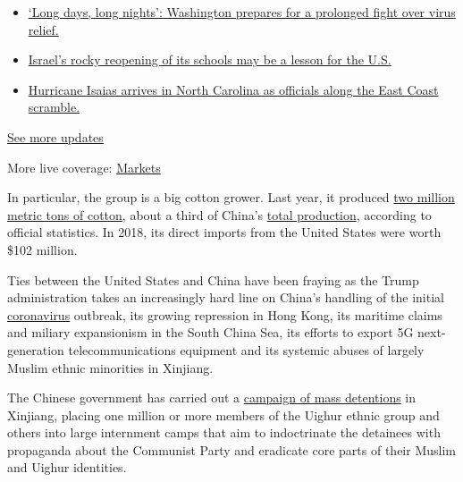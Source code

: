 \begin{itemize}
\tightlist
\item
  \href{https://www.nytimes.com/2020/08/04/world/coronavirus-covid-19.html?action=click\&pgtype=Article\&state=default\&region=MAIN_CONTENT_1\&context=storylines_live_updates\#link-6b644638}{`Long
  days, long nights': Washington prepares for a prolonged fight over
  virus relief.}
\item
  \href{https://www.nytimes.com/2020/08/04/world/coronavirus-covid-19.html?action=click\&pgtype=Article\&state=default\&region=MAIN_CONTENT_1\&context=storylines_live_updates\#link-7af9fca0}{Israel's
  rocky reopening of its schools may be a lesson for the U.S.}
\item
  \href{https://www.nytimes.com/2020/08/04/world/coronavirus-covid-19.html?action=click\&pgtype=Article\&state=default\&region=MAIN_CONTENT_1\&context=storylines_live_updates\#link-33bf9168}{Hurricane
  Isaias arrives in North Carolina as officials along the East Coast
  scramble.}
\end{itemize}

\href{https://www.nytimes.com/2020/08/04/world/coronavirus-covid-19.html?action=click\&pgtype=Article\&state=default\&region=MAIN_CONTENT_1\&context=storylines_live_updates}{See
more updates}

More live coverage:
\href{https://www.nytimes.com/live/2020/08/03/business/stock-market-today-coronavirus?action=click\&pgtype=Article\&state=default\&region=MAIN_CONTENT_1\&context=storylines_live_updates}{Markets}

In particular, the group is a big cotton grower. Last year, it produced
\href{http://www.xjbt.gov.cn/c/2020-04-26/7346731.shtml?ad_check=1}{two
million metric tons of cotton}, about a third of China's
\href{http://www.stats.gov.cn/tjsj/zxfb/201912/t20191217_1718007.html}{total
production}, according to official statistics. In 2018, its direct
imports from the United States were worth \$102 million.

Ties between the United States and China have been fraying as the Trump
administration takes an increasingly hard line on China's handling of
the initial
\href{https://www.nytimes.com/news-event/coronavirus}{coronavirus}
outbreak, its growing repression in Hong Kong, its maritime claims and
miliary expansionism in the South China Sea, its efforts to export 5G
next-generation telecommunications equipment and its systemic abuses of
largely Muslim ethnic minorities in Xinjiang.

The Chinese government has carried out a
\href{https://www.nytimes.com/interactive/2019/11/16/world/asia/china-xinjiang-documents.html}{campaign
of mass detentions} in Xinjiang, placing one million or more members of
the Uighur ethnic group and others into large internment camps that aim
to indoctrinate the detainees with propaganda about the Communist Party
and eradicate core parts of their Muslim and Uighur identities.

